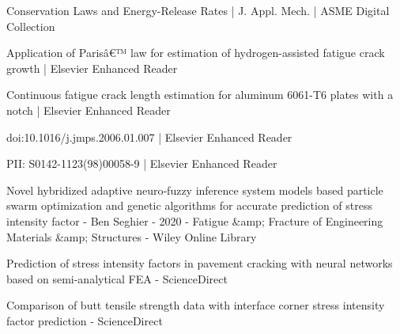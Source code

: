 Conservation Laws and Energy-Release Rates | J. Appl. Mech. | ASME Digital Collection

Application of Parisâ€™ law for estimation of hydrogen-assisted fatigue crack growth | Elsevier Enhanced Reader

Continuous fatigue crack length estimation for aluminum 6061-T6 plates with a notch | Elsevier Enhanced Reader

doi:10.1016/j.jmps.2006.01.007 | Elsevier Enhanced Reader

PII: S0142-1123(98)00058-9 | Elsevier Enhanced Reader


Novel hybridized adaptive neuro‐fuzzy inference system models based particle swarm optimization and genetic algorithms for accurate prediction of stress intensity factor - Ben Seghier - 2020 - Fatigue &amp; Fracture of Engineering Materials &amp; Structures - Wiley Online Library

Prediction of stress intensity factors in pavement cracking with neural networks based on semi-analytical FEA - ScienceDirect

Comparison of butt tensile strength data with interface corner stress intensity factor prediction - ScienceDirect